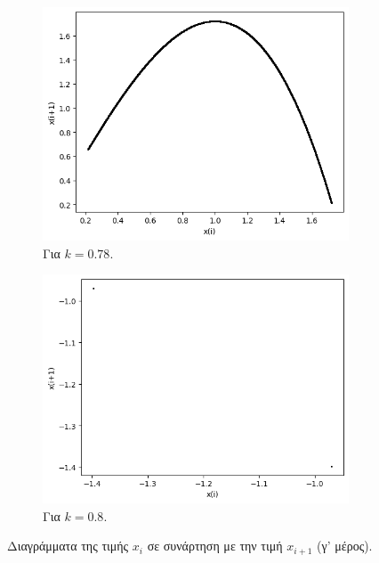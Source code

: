 \begin{figure}[ht]
	\centering
	\begin{subfigure}[b]{0.4\textwidth}
		\centering
		\includegraphics[width=\textwidth]{LateX images/graphs q14/g25}
		\caption{Για $k=0.78$.}
		\label{f:k81}
	\end{subfigure}
	\hfill
	\begin{subfigure}[b]{0.4\textwidth}
		\centering
		\includegraphics[width=\textwidth]{LateX images/graphs q14/g26}
		\caption{Για $k=0.8$.}
		\label{f:k82}
	\end{subfigure}
	\hfill	
	\caption{Διαγράμματα της τιμής \(x_i\) σε συνάρτηση με την τιμή \(x_{i+1}\) (γ' μέρος).}	
\end{figure}

